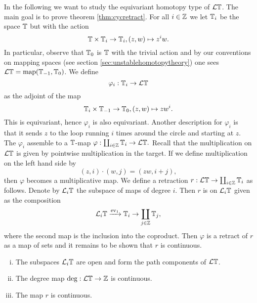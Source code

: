 In the following we want to study the equivariant
homotopy type of $\mathcal{L}\mathbb{T}$. The main goal is
to prove
theorem \ref{thm:cycretract}.
For all $i\in \mathbb{Z}$ we let $\mathbb{T}_i$ be the space 
$\mathbb{T}$ but with the action
\begin{equation}\label{eq:circlemodifiedaction}
\mathbb{T}\times \mathbb{T}_i\to \mathbb{T}_i, (z,w)\mapsto z^iw.
\end{equation}
In particular, observe that $\mathbb{T}_0$ is $\mathbb{T}$ with the trivial
action and by our conventions on mapping spaces (see section \ref{sec:unstablehomotopytheory})
one sees $\mathcal{L}\mathbb{T} = \mathrm{map}(\mathbb{T}_{-1},\mathbb{T}_0)$.
We define
$$\varphi_i:\mathbb{T}_i\to \mathcal{L}\mathbb{T}$$
as the adjoint of the map
\[
\mathbb{T}_i\times \mathbb{T}_{-1}\to \mathbb{T}_0, (z,w)\mapsto zw^i.
\]
This is equivariant, hence $\varphi_i$ is also equivariant.
Another description for $\varphi_i$ is that it sends $z$ to the loop running $i$
times around the circle and starting at $z$. 
The $\varphi_i$  assemble to a $\mathbb{T}$-map 
$\varphi:\coprod_{i\in \mathbb{Z}} \mathbb{T}_i\to \mathcal{L}\mathbb{T}.$ Recall that the multiplication
on $\mathcal{L}\mathbb{T}$ is given by pointwise multiplication in the target.
If we define multiplication on the left hand side by
$$(z,i)\cdot (w,j) = (zw, i+j),$$
then $\varphi$ becomes a multiplicative map.
We define a retraction $r:\mathcal{L}\mathbb{T}\to\coprod_{i\in \mathbb{Z}} \mathbb{T}_i$
as follows. Denote by $\mathcal{L}_i\mathbb{T}$ the subspace of maps of degree $i$.
Then $r$ is on $\mathcal{L}_i\mathbb{T}$ given as the composition
$$\mathcal{L}_i\mathbb{T} \xrightarrow{\mathrm{ev}_1} \mathbb{T}_i 
\to \coprod_{j\in \mathbb{Z}} \mathbb{T}_j,$$
where the second map is the inclusion into the coproduct.
Then $\varphi$ is a retract of $r$ as a map of sets and it remains to
be shown that $r$ is continuous.
\begin{lem}
\begin{enumerate}[(i)]
\item The subspaces $\mathcal{L}_i\mathbb{T}$ are open and form the
path components of $\mathcal{L}\mathbb{T}$.
\item The degree map $\mathrm{deg}:\mathcal{L}\mathbb{T} \to \mathbb{Z}$ is continuous.
\item The map $r$ is continuous.
\end{enumerate}
\end{lem}
